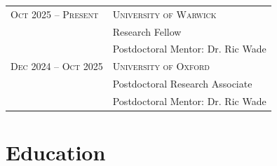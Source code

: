 \documentclass[a4paper,10pt]{article} %
\begin{document}

\begin{longtable}{>{\arraybackslash}p{4cm}p{10cm}}

\textsc{Oct 2025 -- Present}  &\textsc{University of Warwick} \\ 
 &\quad Research Fellow \\
 &\quad Postdoctoral Mentor: Dr. Ric Wade \vspace{0.2em}\\

\textsc{Dec 2024 -- Oct 2025}  &\textsc{University of Oxford} \\ 
 &\quad Postdoctoral Research Associate \\
 &\quad Postdoctoral Mentor: Dr. Ric Wade

\end{longtable}


\section{Education}


%
%
\end{document}
